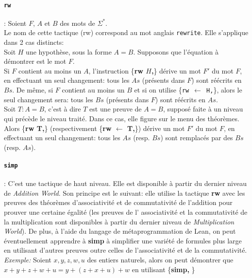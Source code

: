 \paragraph {\texttt{rw}}: Soient $F$, $A$ et $B$ des mots de $\Sigma^*$.\\
Le nom de cette tactique (rw) correspond au mot anglais \texttt{rewrite}. Elle s'applique dans 2 cas distincts:\\
Soit $H$ une hypothèse, sous la forme $A=B$. Supposons que l'équation à démontrer est le mot $F$. \\Si $F$ contient au moins un $A$, l'instruction \big\{\textbf{rw $H$,}\big\} dérive un mot $F'$ du mot $F$, en effectuant un seul changement: tous les $As$ (présents dans $F$) sont réécrits en $Bs$. De même, si $F$ contient au moins un $B$ et si on utilise \big\{\texttt{rw $\leftarrow$ H,}\big\}, alors le seul changement sera: tous les $Bs$ (présents dans $F$) sont réécrits en $As$.\\
Soit $T: A=B$, c'est à dire $T$ est une preuve de $A=B$, supposé faite à un niveau qui précède le niveau traité. Dans ce cas, elle figure sur le menu des théorèmes. Alors \big\{\textbf{rw T,}\big\} (respectivement \big\{\textbf{rw $\leftarrow$ T,}\big\}) dérive un mot $F'$ du mot $F$, en effectuant un seul changement: tous les $As$ (resp. $Bs$) sont remplacés par des $Bs$ (resp. $As$). 

\paragraph {\texttt{simp}}: C'est une tactique de haut niveau. Elle est disponible à partir du dernier niveau de \textit{Addition World}. Son principe est le suivant: elle utilise la tactique \textbf{rw} avec les preuves des théorèmes d'associativité et de commutativité de l'addition pour prouver une certaine égalité (les preuves de l' associativité et la commutativité de la multiplication sont disponibles à partir du dernier niveau de \textit{Multiplication World}). De plus, à l'aide du langage de métaprogrammation de Lean, on peut éventuellement apprendre  à \textbf{simp} à simplifier une variété de formules plus large en utilisant d'autres preuves outre celles de l'associativité et de la commutativité.   \\
\textit{Exemple:} Soient $x,y,z,w,u$ des entiers naturels, alors on peut démontrer que $x+y+z+w+u=y+(z+x+u)+w$ en utilisant \big\{\textbf{simp,} \big\}

